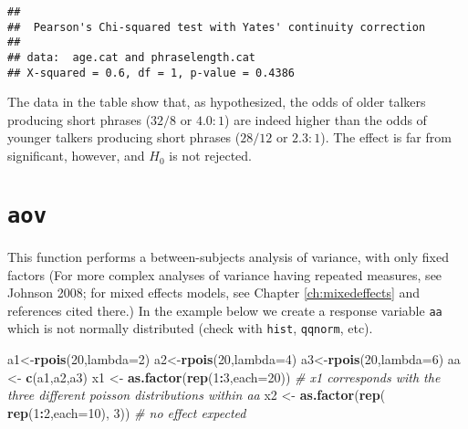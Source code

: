 \documentclass[]{book}
\newenvironment{Shaded}{\begin{snugshade}}{\end{snugshade}}
\newcommand{\CommentTok}[1]{\textcolor[rgb]{0.56,0.35,0.01}{\textit{#1}}}
\newcommand{\DataTypeTok}[1]{\textcolor[rgb]{0.13,0.29,0.53}{#1}}
\newcommand{\DecValTok}[1]{\textcolor[rgb]{0.00,0.00,0.81}{#1}}
\newcommand{\KeywordTok}[1]{\textcolor[rgb]{0.13,0.29,0.53}{\textbf{#1}}}
\newcommand{\NormalTok}[1]{#1}
\newcommand{\OperatorTok}[1]{\textcolor[rgb]{0.81,0.36,0.00}{\textbf{#1}}}
\newcommand{\StringTok}[1]{\textcolor[rgb]{0.31,0.60,0.02}{#1}}
\begin{document}
\begin{verbatim}
## 
##  Pearson's Chi-squared test with Yates' continuity correction
## 
## data:  age.cat and phraselength.cat
## X-squared = 0.6, df = 1, p-value = 0.4386
\end{verbatim}

The data in the table show that, as hypothesized, the odds of older talkers producing short phrases (\(32/8\) or \(4.0:1\)) are indeed higher than the odds of younger talkers producing short phrases (\(28/12\) or \(2.3:1\)). The effect is far from significant, however, and \(H_0\) is not rejected.

\hypertarget{aov}{%
\section{\texorpdfstring{\texttt{aov}}{aov}}\label{aov}}

This function performs a between-subjects analysis of variance, with
only fixed factors \citep{john08} (For more complex
analyses of variance having repeated measures, see Johnson 2008; for mixed effects models, see Chapter \ref{ch:mixedeffects} and references cited there.)
In the example below we create a
response variable \texttt{aa} which is not normally distributed
(check
with \texttt{hist}, \texttt{qqnorm}, etc).\\

\begin{Shaded}
\begin{Highlighting}[]
\NormalTok{a1<-}\KeywordTok{rpois}\NormalTok{(}\DecValTok{20}\NormalTok{,}\DataTypeTok{lambda=}\DecValTok{2}\NormalTok{)}
\NormalTok{a2<-}\KeywordTok{rpois}\NormalTok{(}\DecValTok{20}\NormalTok{,}\DataTypeTok{lambda=}\DecValTok{4}\NormalTok{) }
\NormalTok{a3<-}\KeywordTok{rpois}\NormalTok{(}\DecValTok{20}\NormalTok{,}\DataTypeTok{lambda=}\DecValTok{6}\NormalTok{) }
\NormalTok{aa <-}\StringTok{ }\KeywordTok{c}\NormalTok{(a1,a2,a3) }
\NormalTok{x1 <-}\StringTok{ }\KeywordTok{as.factor}\NormalTok{(}\KeywordTok{rep}\NormalTok{(}\DecValTok{1}\OperatorTok{:}\DecValTok{3}\NormalTok{,}\DataTypeTok{each=}\DecValTok{20}\NormalTok{)) }
\CommentTok{# x1 corresponds with the three different poisson distributions within aa}
\NormalTok{x2 <-}\StringTok{ }\KeywordTok{as.factor}\NormalTok{(}\KeywordTok{rep}\NormalTok{( }\KeywordTok{rep}\NormalTok{(}\DecValTok{1}\OperatorTok{:}\DecValTok{2}\NormalTok{,}\DataTypeTok{each=}\DecValTok{10}\NormalTok{), }\DecValTok{3}\NormalTok{)) }\CommentTok{# no effect expected}
\end{Highlighting}
\end{Shaded}
\end{document}
